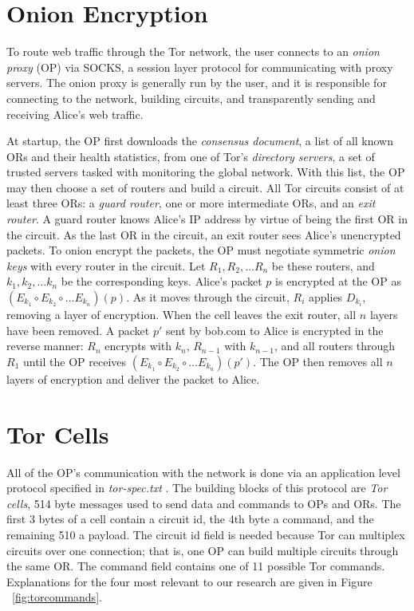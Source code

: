 \section{Onion Encryption}
To route web traffic through the Tor network, the user connects to an \textit{onion proxy} (OP) via SOCKS, a session layer protocol for communicating with proxy servers. The onion proxy is generally run by the user, and it is responsible for connecting to the network, building circuits, and transparently sending and receiving Alice's web traffic.

At startup, the OP first downloads the \textit{consensus document}, a list of all known ORs and their health statistics, from one of Tor's \textit{directory servers}, a set of trusted servers tasked with monitoring the global network. With this list, the OP may then choose a set of routers and build a circuit. All Tor circuits consist of at least three ORs: a \textit{guard router}, one or more intermediate ORs, and an \textit{exit router}. A guard router knows Alice's IP address by virtue of being the first OR in the circuit. As the last OR in the circuit, an exit router sees Alice's unencrypted packets. To onion encrypt the packets, the OP must negotiate symmetric \textit{onion keys} with every router in the circuit. Let $R_1, R_2, \dots R_n$ be these routers, and $k_1, k_2, \dots k_n$ be the corresponding keys. Alice's packet $p$ is encrypted at the OP as $(E_{k_1} \circ E_{k_2} \circ \dots E_{k_n})(p)$. As it moves through the circuit, $R_i$ applies $D_{k_i}$, removing a layer of encryption. When the cell leaves the exit router, all $n$ layers have been removed. A packet $p'$ sent by bob.com to Alice is encrypted in the reverse manner: $R_n$ encrypts with $k_n$, $R_{n-1}$ with $k_{n-1}$, and all routers through $R_1$ until the OP receives $(E_{k_1} \circ E_{k_2} \circ \dots E_{k_n})(p')$. The OP then removes all $n$ layers of encryption and deliver the packet to Alice.

\section{Tor Cells}
All of the OP's communication with the network is done via an application level protocol specified in \textit{tor-spec.txt} \citep{torspec}. The building blocks of this protocol are \textit{Tor cells}, 514 byte messages used to send data and commands to OPs and ORs. The first 3 bytes of a cell contain a circuit id, the 4th byte a command, and the remaining 510 a payload. The circuit id field is needed because Tor can multiplex circuits over one connection; that is, one OP can build multiple circuits through the same OR. The command field contains one of 11 possible Tor commands. Explanations for the four most relevant to our research are given in Figure ~\ref{fig:torcommands}.

